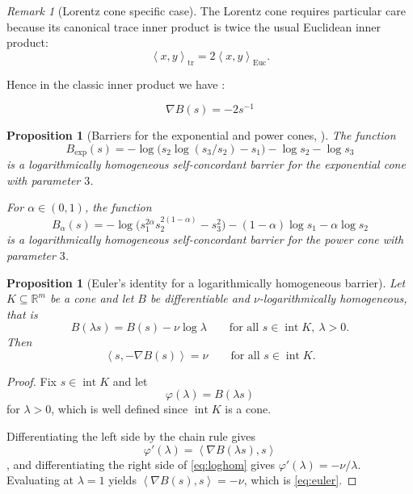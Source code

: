 \documentclass[a4paper,11pt]{book}
\theoremstyle{plain}
\newtheorem{proposition}[theorem]{Proposition}
\theoremstyle{definition}
\theoremstyle{remark}
\newtheorem{remark}[theorem]{Remark}
\numberwithin{equation}{chapter}
\numberwithin{algorithm}{chapter}
\newcommand{\R}{\mathbb{R}}
\newcommand{\inner}[2]{\left\langle #1, #2 \right\rangle}
\newcommand{\intr}{\operatorname{int}}
\begin{document}
	
	\begin{remark}[Lorentz cone specific case]
		The Lorentz cone requires particular care because its canonical trace inner
		product is twice the usual Euclidean inner product:
		\[
		\inner{x}{y}_{\mathrm{tr}}
		=
		2\inner{x}{y}_{\mathrm{Euc}}.
		\]
		
		Hence in the classic inner product we have :
		
		$$ \nabla B(s) =  -2s^{-1}$$
	\end{remark}
	
	\begin{proposition}[Barriers for the exponential and power cones,
		\cite{NesterovNemirovskii1994,Chares2009}]
		The function
		\begin{equation}
			B_{\exp}(s)
			=
			-\log\bigl(
			s_2\log(s_3/s_2)-s_1
			\bigr)
			-\log s_2
			-\log s_3
		\end{equation}
		is a logarithmically homogeneous self-concordant barrier for the exponential
		cone with parameter \(3\).
		
		For \(\alpha\in(0,1)\), the function
		\begin{equation}
			B_\alpha(s)
			=
			-\log\bigl(
			s_1^{2\alpha}s_2^{2(1-\alpha)}-s_3^2
			\bigr)
			-(1-\alpha)\log s_1
			-\alpha\log s_2
		\end{equation}
		is a logarithmically homogeneous self-concordant barrier for the power cone
		with parameter \(3\).
	\end{proposition}
	
	\begin{proposition}[Euler's identity for a logarithmically homogeneous barrier]
		\label{prop:euler}
		Let $K\subseteq\R^m$ be a cone and let $B$ be differentiable and
		$\nu$-logarithmically homogeneous, that is
		\begin{equation}\label{eq:loghom}
			B(\lambda s)=B(s)-\nu\log\lambda
			\qquad\text{for all }s\in\intr K,\ \lambda>0 .
		\end{equation}
		Then
		\begin{equation}\label{eq:euler}
			\inner{s}{-\nabla B(s)}=\nu
			\qquad\text{for all }s\in\intr K .
		\end{equation}
	\end{proposition}
	
	\begin{proof}
		Fix $s\in\intr K$ and let $$\varphi(\lambda)=B(\lambda s)$$ for $\lambda>0$, which
		is well defined since $\intr K$ is a cone. 
		
		
		Differentiating the left side by the
		chain rule gives $$\varphi'(\lambda)=\inner{\nabla B(\lambda s)}{s}$$, and
		differentiating the right side of \eqref{eq:loghom} gives
		$\varphi'(\lambda)=-\nu/\lambda$. Evaluating at $\lambda=1$ yields
		$\inner{\nabla B(s)}{s}=-\nu$, which is \eqref{eq:euler}.
	\end{proof}
	
\end{document}
